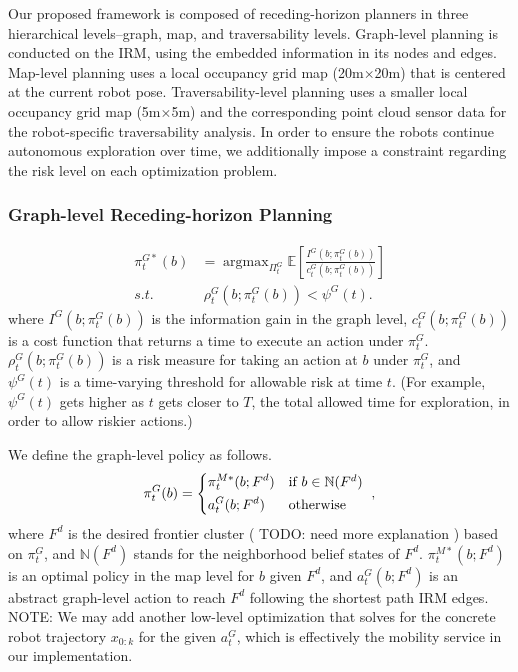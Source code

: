 \documentclass[letterpaper, 10 pt, conference]{ieeeconf}  %
\newcommand{\todo}[1]{{\color{red} #1 }} %
\newcommand{\note}[1]{{\color{cyan} NOTE: #1 }}
\newcommand{\argmax}{\mathop{\mathrm{argmax}}}
\begin{document}
Our proposed framework is composed of receding-horizon planners in three hierarchical levels--graph, map, and traversability levels.
Graph-level planning is conducted on the IRM, using the embedded information in its nodes and edges.
Map-level planning uses a local occupancy grid map (20m$\times$20m) that is centered at the current robot pose.
Traversability-level planning uses a smaller local occupancy grid map (5m$\times$5m) and the corresponding point cloud sensor data for the robot-specific traversability analysis.
In order to ensure the robots continue autonomous exploration over time, we additionally impose a constraint regarding the risk level on each optimization problem.


\subsubsection{Graph-level Receding-horizon Planning}

\begin{align}
  \pi_t^{G*}(b) &= \argmax_{\Pi_t^G} \mathbb{E} \left[ \frac{I^G(b; \pi_t^G(b))}{c_t^G(b; \pi_t^G(b))} \right]
  \nonumber \\
  s.t.~&~\rho_t^G(b; \pi_t^G(b))< \psi^G(t).
  \label{eq:graphopt}
\end{align}
where $I^G(b; \pi_t^G(b))$ is the information gain in the graph level,
$c_t^G(b; \pi_t^G(b))$ is a cost function that returns a time to execute an action under $\pi_t^G$.
$\rho_t^G(b; \pi_t^G(b))$ is a risk measure for taking an action at $b$ under $\pi_t^G$, and
$\psi^G(t)$ is a time-varying threshold for allowable risk at time $t$.
(For example, $\psi^G(t)$ gets higher as $t$ gets closer to $T$, the total allowed time for exploration, in order to allow riskier actions.)

We define the graph-level policy as follows.
\begin{align}
  \pi_t^G(b) = 
  \begin{dcases*}
    \pi_t^{M*}(b; F^d) & if $b \in \mathbb{N}(F^d)$ \\
    a_t^G(b; F^d) & otherwise 
  \end{dcases*},
\end{align}
where $F^d$ is the desired frontier cluster (\todo{TODO: need more explanation}\!\!) based on $\pi_t^G$, and
$\mathbb{N}(F^d)$ stands for the neighborhood belief states of $F^d$.
$\pi_t^{M*}(b; F^d)$ is an optimal policy in the map level for $b$ given $F^d$, and
$a_t^G(b; F^d)$ is an abstract graph-level action to reach $F^d$ following the shortest path IRM edges.
\note{We may add another low-level optimization that solves for the concrete robot trajectory $x_{0:k}$ for the given $a_t^G$, which is effectively the mobility service in our implementation.}
\end{document}
